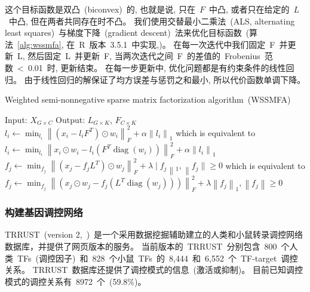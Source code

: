 这个目标函数是双凸~(biconvex)~的, 也就是说, 只在~$F$~中凸, 或者只在给定的~$L$~中凸, 但在两者共同存在时不凸。
我们使用交替最小二乘法~(ALS, alternating least squares)~与梯度下降~(gradient descent)~法来优化目标函数~(算法~\ref{alg:wssmfa}, 在~R~版本~3.5.1~中实现,\cite{goeman2012penalized,goeman2010l1})。
在每一次迭代中我们固定~F~并更新~L, 然后固定~L~并更新~F, 当两次迭代之间~F~的差值的~Frobenius~范数~<~0.01~时, 更新结束。
在每一步更新中, 优化问题都是有约束条件的线性回归。
由于线性回归的解保证了均方误差与惩罚之和最小, 所以代价函数单调下降。
\begin{algorithm}
    \caption{Weighted semi-nonnegative sparse matrix factorization algorithm~(WSSMFA)}
    \label{alg:wssmfa}
    \begin{algorithmic}[1]
        \State Input: $X_{G \times C}$                                   
        \State Output: $L_{G \times K}$, $F_{C \times K}$                
                                                          
                \State $l_{i} \leftarrow \min _{l_{i}}\left\|\left(x_{i}-l_{i} F^{T}\right) \odot w_{i}\right\|_{F}^{2}+\alpha\left\|l_{i}\right\|_{1}$ 
                \State which is equivalent to 
                \State $l_{i} \leftarrow \min _{l_{i}}\left\|x_{i} \odot w_{i}-l_{i}\left(F^{T} \operatorname{diag}\left(w_{i}\right)\right)\right\|_{F}^{2}+\alpha\left\|l_{i}\right\|_{1}$
            \EndFor
                \State $f_{j} \leftarrow \min _{f_{j}}\left\|\left(x_{j}-f_{j} L^{T}\right) \odot w_{j}\right\|_{F}^{2}+\lambda \mid f_{j}\left\|_{1},\right\| f_{j} \| \geq 0$
                \State which is equivalent to 
                \State $f_{j} \leftarrow \min _{f_{j}}\left\|\left(x_{j} \odot w_{j}-f_{j}\left(L^{T} \operatorname{diag}\left(w_{j}\right)\right)\right)\right\|_{F}^{2}+\lambda\left\|f_{j}\right\|_{1},\left\|f_{j}\right\| \geq 0$
            \EndFor
        \EndWhile           
  \end{algorithmic}
\end{algorithm}

\subsubsection{构建基因调控网络}
TRRUST~(version 2,~\cite{han2018trrust})~是一个采用数据挖掘辅助建立的人类和小鼠转录调控网络数据库，并提供了网页版本的服务。
当前版本的~TRRUST~分别包含~800~个人类~TFs~(调控因子)~和~828~个小鼠~TFs~的~8,444~和~6,552~个~TF-target~调控关系。
TRRUST~数据库还提供了调控模式的信息~(激活或抑制)。
目前已知调控模式的调控关系有~8972~个~(59.8\%)。

